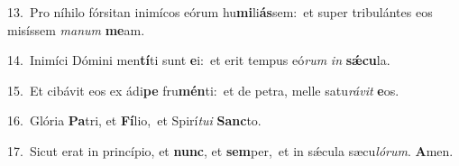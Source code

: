 {\numbfont\textcolor{\numbcolor}{13.}}~Pro níhilo fórsitan inimícos eórum hu\-\textbf{mi}\-li\-\textbf{ás}\-sem:~\star et super tribulántes eos misíssem \textit{ma}\-\textit{num} \textbf{me}\-am.\par
{\numbfont\textcolor{\numbcolor}{14.}}~Inimíci Dómini men\-\textbf{tí}\-ti sunt \textbf{e}\-i:~\star et erit tempus eó\textit{rum} \textit{in} \textbf{sǽ}\-\textbf{cu}la.\par
{\numbfont\textcolor{\numbcolor}{15.}}~Et cibávit eos ex ádi\textbf{pe} fru\-\textbf{mén}\-ti:~\star et de petra, melle satu\-\textit{rá}\-\textit{vit} \textbf{e}\-os.\par
{\numbfont\textcolor{\numbcolor}{16.}}~Glória \textbf{Pa}\-tri, et \textbf{Fí}\-lio,~\star et Spirí\-\textit{tu}\-\textit{i} \textbf{Sanc}\-to.\par
{\numbfont\textcolor{\numbcolor}{17.}}~Sicut erat in princípio, et \textbf{nunc}\-, et \textbf{sem}\-per,~\star et in sǽcula sæcu\-\textit{ló}\-\textit{rum}. \textbf{A}\-men.\par
